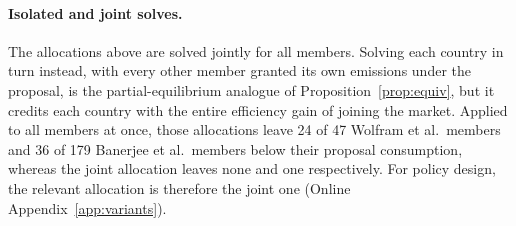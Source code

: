\documentclass[12pt,english]{article}
\theoremstyle{remark}
\begin{document}
\paragraph{Isolated and joint solves.} The allocations above are solved jointly for all members. Solving each country in turn instead, with every other member granted its own emissions under the proposal, is the partial-equilibrium analogue of Proposition~\ref{prop:equiv}, but it credits each country with the entire efficiency gain of joining the market. Applied to all members at once, those allocations leave 24 of 47 Wolfram et al.\ members and 36 of 179 Banerjee et al.\ members below their proposal consumption, whereas the joint allocation leaves none and one respectively. For policy design, the relevant allocation is therefore the joint one (Online Appendix~\ref{app:variants}).
\end{document}
